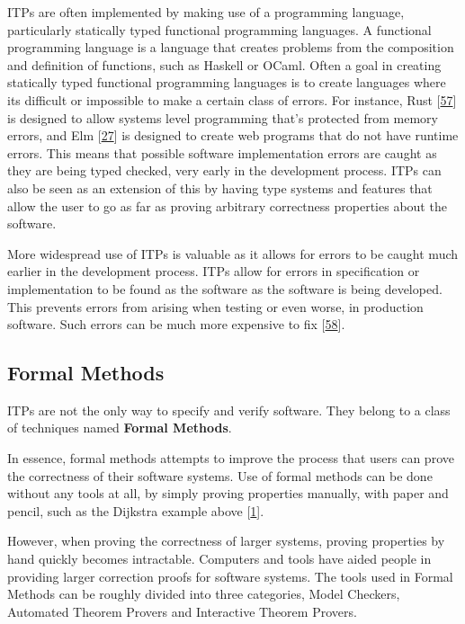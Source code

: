\documentclass[
]{article}
\begin{document}
ITPs are often implemented by making use of a programming language,
particularly statically typed functional programming languages. A
functional programming language is a language that creates problems from
the composition and definition of functions, such as Haskell or OCaml.
Often a goal in creating statically typed functional programming
languages is to create languages where its difficult or impossible to
make a certain class of errors. For instance, Rust
{[}\protect\hyperlink{ref-Rust}{57}{]} is designed to allow systems
level programming that's protected from memory errors, and Elm
{[}\protect\hyperlink{ref-Elm}{27}{]} is designed to create web programs
that do not have runtime errors. This means that possible software
implementation errors are caught as they are being typed checked, very
early in the development process. ITPs can also be seen as an extension
of this by having type systems and features that allow the user to go as
far as proving arbitrary correctness properties about the software.

More widespread use of ITPs is valuable as it allows for errors to be
caught much earlier in the development process. ITPs allow for errors in
specification or implementation to be found as the software as the
software is being developed. This prevents errors from arising when
testing or even worse, in production software. Such errors can be much
more expensive to fix {[}\protect\hyperlink{ref-CodeComplete}{58}{]}.

\hypertarget{formal-methods}{%
\subsection{Formal Methods}\label{formal-methods}}

ITPs are not the only way to specify and verify software. They belong to
a class of techniques named \textbf{Formal Methods}.

In essence, formal methods attempts to improve the process that users
can prove the correctness of their software systems. Use of formal
methods can be done without any tools at all, by simply proving
properties manually, with paper and pencil, such as the Dijkstra example
above {[}\protect\hyperlink{ref-Dijkstra}{1}{]}.

However, when proving the correctness of larger systems, proving
properties by hand quickly becomes intractable. Computers and tools have
aided people in providing larger correction proofs for software systems.
The tools used in Formal Methods can be roughly divided into three
categories, Model Checkers, Automated Theorem Provers and Interactive
Theorem Provers.
\end{document}

